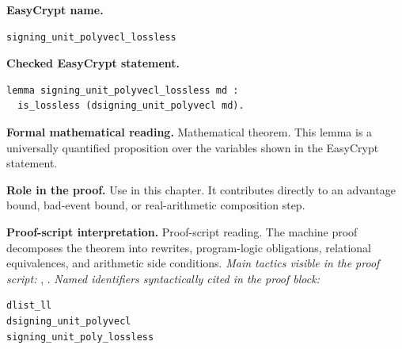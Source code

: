 \begin{formaltheorem}
\noindent\textbf{EasyCrypt name.}
\begin{lstlisting}[language=EasyCrypt,basicstyle=\ttfamily\scriptsize]
signing_unit_polyvecl_lossless
\end{lstlisting}
\noindent\textbf{Checked EasyCrypt statement.}
\begin{lstlisting}[language=EasyCrypt,basicstyle=\ttfamily\scriptsize]
lemma signing_unit_polyvecl_lossless md :
  is_lossless (dsigning_unit_polyvecl md).
\end{lstlisting}
\noindent\textbf{Formal mathematical reading.}
Mathematical theorem. This lemma is a universally quantified proposition over the variables shown in the EasyCrypt statement.

\noindent\textbf{Role in the proof.}
Use in this chapter. It contributes directly to an advantage bound, bad-event bound, or real-arithmetic composition step.

\noindent\textbf{Proof-script interpretation.}
Proof-script reading. The machine proof decomposes the theorem into rewrites, program-logic obligations, relational equivalences, and arithmetic side conditions.
\emph{Main tactics visible in the proof script:} , .
\emph{Named identifiers syntactically cited in the proof block:}
\begin{lstlisting}[language=EasyCrypt,basicstyle=\ttfamily\scriptsize]
dlist_ll
dsigning_unit_polyvecl
signing_unit_poly_lossless
\end{lstlisting}

\end{formaltheorem}

